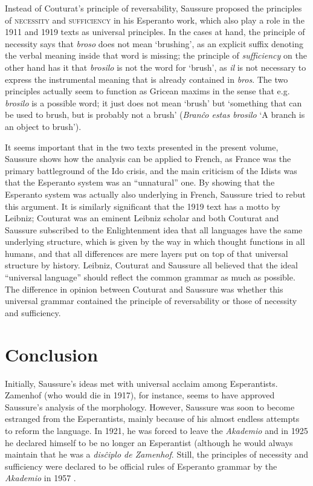 \documentclass[output=paper]{langsci/langscibook}
\begin{document}
Instead of Couturat's principle of reversability, Saussure proposed
the principles of \textsc{necessity} and \textsc{sufficiency} in his
Esperanto work, which also play a role in the 1911 and 1919 texts as
universal principles. In the cases at hand, the principle of necessity
says that \emph{broso} does not mean `brushing', as an explicit suffix
denoting the verbal meaning inside that word is missing; the principle
of \emph{sufficiency} on the other hand has it that \emph{brosilo} is
not the word for `brush', as \emph{il} is not necessary to express the
instrumental meaning that is already contained in \emph{bros}. The two
principles actually seem to function as Gricean maxims in the sense
that e.g. \emph{brosilo} is a possible word; it just does not mean
`brush' but `something that can be used to brush, but is probably not
a brush' (\emph{Bran\^co estas brosilo} `A branch is an object to
brush').

It seems important that in the two texts presented in the present
volume, Saussure shows how the analysis can be applied to French, as
France was the primary battleground of the Ido crisis, and the main
criticism of the Idists was that the Esperanto system was an
``unnatural'' one. By showing that the Esperanto system was actually
also underlying in French, Saussure tried to rebut this argument. It
is similarly significant that the 1919 text has a motto by Leibniz;
Couturat was an eminent Leibniz scholar and both Couturat and Saussure
subscribed to the Enlightenment idea that all languages have the same
underlying structure, which is given by the way in which thought
functions in all humans, and that all differences are mere layers put
on top of that universal structure by history. Leibniz, Couturat and
Saussure all believed that the ideal ``universal language'' should
reflect the common grammar as much as possible. The difference in
opinion between Couturat and Saussure was whether this universal
grammar contained the principle of reversability or those of necessity
and sufficiency.

\section{Conclusion} \label{sec:esperanto-conclusion}

Initially, Saussure's ideas met with universal acclaim among
Esperantists. Zamenhof (who would die in 1917), for instance, seems to
have approved Saussure's analysis of the morphology. However, Saussure
was soon to become estranged from the Esperantists, mainly because of
his almost endless attempts to reform the language. In 1921, he was
forced to leave the \emph{Akademio} and in 1925 he declared himself to
be no longer an Esperantist (although he would always maintain that he
was a \emph{dis\^ciplo de Zamenhof}. Still, the principles of
necessity and sufficiency were declared to be official rules of
Esperanto grammar by the \emph{Akademio} in 1957
\citep{garvia2015,kuenzli2015}.


\sloppy
\printbibliography[heading=subbibliography,notkeyword=this] 
\end{document}
